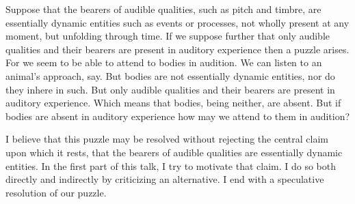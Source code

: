 \documentclass[12pt]{article}
\title{\mytitle}
\author{\myauthor}
\date{} %
\begin{document}
\maketitle
\begin{abstract} %
\noindent We hear sounds, and their sources, and their audible qualities. Sounds and their sources are essentially dynamic entities, not wholly present at any given moment, but unfolding through their temporal interval. Sounds and their sources, essentially dynamic entities, are the bearers or \emph{susbtrata} of audible qualities. Audible qualities are qualities essentially sustained by activity. The only bearers of audible qualities present in auditory experience are essentially dynamic entities. Bodies are not, in this sense, essentially dynamic entities and so are not present in our auditory experience. Though absent in auditory experience, we may, nonetheless, attend to bodies in audition, when an audible sound-generating event in which they participate presents a dynamic aural image of them.

\end{abstract}

\setlength{\parindent}{1em}


Suppose that the bearers of audible qualities, such as pitch and timbre, are essentially dynamic entities such as events or processes, not wholly present at any moment, but unfolding through time. If we suppose further that only audible qualities and their bearers are present in auditory experience then a puzzle arises. For we seem to be able to attend to bodies in audition. We can listen to an animal’s approach, say. But bodies are not essentially dynamic entities, nor do they inhere in such. But only audible qualities and their bearers are present in auditory experience. Which means that bodies, being neither, are absent. But if bodies are absent in auditory experience how may we attend to them in audition?

I believe that this puzzle may be resolved without rejecting the central claim upon which it rests, that the bearers of audible qualities are essentially dynamic entities. In the first part of this talk, I try to motivate that claim. I do so both directly and indirectly by criticizing an alternative. I end with a speculative resolution of our puzzle.
\end{document}

